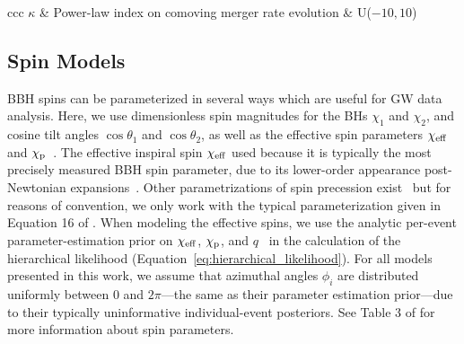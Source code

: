 \begin{deluxetable}{ccc}
\label{tab:powerlawredshift}
\startdata
$\kappa$ & Power-law index on comoving merger rate evolution & U($-10, 10$) \\
\enddata
\end{deluxetable}


\subsection{Spin Models}\label{appendix:spinModels}

BBH spins can be parameterized in several ways which are useful for GW data analysis. 
Here, we use dimensionless spin magnitudes for the \acp{BH} $\chi_1$ and $\chi_2$, and cosine tilt angles $\cos\theta_1$ and $\cos\theta_2$, as well as the effective spin parameters $\chi_{\rm eff}$~\citep{Racine:2008qv,Ajith:2009bn,Damour:2001tu} and $\chi_\mathrm{p}$~\citep{Schmidt:2010it,Schmidt:2012rh,Schmidt:2014iyl}. 
The effective inspiral spin $\chi_{\rm eff}$ used because it is typically the most precisely measured \ac{BBH} spin parameter, due to its lower-order appearance post-Newtonian expansions~\citep{Arun:2008kb}. 
Other parametrizations of spin precession exist~\citep[e.g.,][]{Fairhurst:2019vut,Gerosa:2020aiw,Thomas:2020uqj} but for reasons of convention, we only work with the typical parameterization given in Equation 16 of \cite{GWTC:Introduction}.  
When modeling the effective spins, we use the analytic per-event parameter-estimation prior on $\chi_{\rm eff}$, $\chi_\mathrm{p}$, and $q$~\citep{Iwaya:2024zzq} in the calculation of the hierarchical likelihood (Equation~\ref{eq:hierarchical_likelihood}).
For all models presented in this work, we assume that azimuthal angles $\phi_i$ are distributed uniformly between $0$ and $2\pi$---the same as their parameter estimation prior---due to their typically uninformative individual-event posteriors.
See Table 3 of \cite{GWTC:Introduction} for more information about spin parameters.

